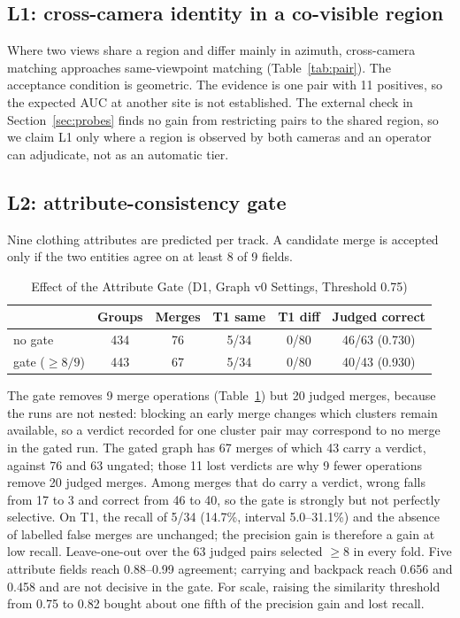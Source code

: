 \documentclass[journal]{IEEEtran}
\begin{document}
\subsection{L1: cross-camera identity in a co-visible region}
Where two views share a region and differ mainly in azimuth, cross-camera matching approaches same-viewpoint matching (Table~\ref{tab:pair}). The acceptance condition is geometric. The evidence is one pair with 11 positives, so the expected AUC at another site is not established. The external check in Section~\ref{sec:probes} finds no gain from restricting pairs to the shared region, so we claim L1 only where a region is observed by both cameras and an operator can adjudicate, not as an automatic tier.

\subsection{L2: attribute-consistency gate}\label{sec:l2}
Nine clothing attributes are predicted per track. A candidate merge is accepted only if the two entities agree on at least 8 of 9 fields.

\begin{table}[t]
\caption{Effect of the Attribute Gate (D1, Graph v0 Settings, Threshold 0.75)}\label{tab:gate}
\centering
\setlength{\tabcolsep}{3.5pt}
\begin{tabular}{@{}lccccc@{}}
\toprule
 & Groups & Merges & T1 same & T1 diff & Judged correct\\
\midrule
no gate & 434 & 76 & 5/34 & 0/80 & 46/63 (0.730)\\
gate ($\ge 8/9$) & 443 & 67 & 5/34 & 0/80 & 40/43 (0.930)\\
\bottomrule
\end{tabular}
\end{table}

The gate removes 9 merge operations (Table~\ref{tab:gate}) but 20 judged merges, because the runs are not nested: blocking an early merge changes which clusters remain available, so a verdict recorded for one cluster pair may correspond to no merge in the gated run. The gated graph has 67 merges of which 43 carry a verdict, against 76 and 63 ungated; those 11 lost verdicts are why 9 fewer operations remove 20 judged merges. Among merges that do carry a verdict, wrong falls from 17 to 3 and correct from 46 to 40, so the gate is strongly but not perfectly selective. On T1, the recall of 5/34 (14.7\%, interval 5.0--31.1\%) and the absence of labelled false merges are unchanged; the precision gain is therefore a gain at low recall. Leave-one-out over the 63 judged pairs selected $\ge 8$ in every fold. Five attribute fields reach 0.88--0.99 agreement; carrying and backpack reach 0.656 and 0.458 and are not decisive in the gate. For scale, raising the similarity threshold from 0.75 to 0.82 bought about one fifth of the precision gain and lost recall.
\end{document}
